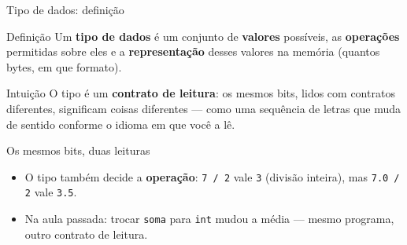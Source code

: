 \documentclass[aspectratio=169]{beamer}
\begin{document}
\begin{frame}{Tipo de dados: definição}
  \begin{block}{Definição}
    Um \textbf{tipo de dados} é um conjunto de \textbf{valores} possíveis,
    as \textbf{operações} permitidas sobre eles e a \textbf{representação}
    desses valores na memória (quantos bytes, em que formato).
  \end{block}
  \begin{exampleblock}{Intuição}
    O tipo é um \textbf{contrato de leitura}: os mesmos bits, lidos com
    contratos diferentes, significam coisas diferentes --- como uma sequência
    de letras que muda de sentido conforme o idioma em que você a lê.
  \end{exampleblock}
\end{frame}

\begin{frame}{Os mesmos bits, duas leituras}
  \begin{center}
  \end{center}
  \begin{itemize}
    \item O tipo também decide a \textbf{operação}: \texttt{7 / 2} vale
      \texttt{3} (divisão inteira), mas \texttt{7.0 / 2} vale \texttt{3.5}.
    \item Na aula passada: trocar \texttt{soma} para \texttt{int} mudou a
      média --- mesmo programa, outro contrato de leitura.
  \end{itemize}
\end{frame}
\end{document}
